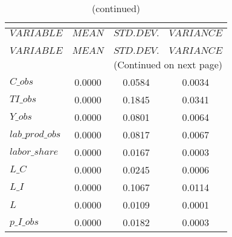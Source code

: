  
\begin{center}
\begin{longtable}{lccc} 
\caption{THEORETICAL MOMENTS}\\
 \label{Table:th_moments}\\
\toprule 
$VARIABLE        $	 & 	 $         MEAN$	 & 	 $    STD. DEV.$	 & 	 $     VARIANCE$\\
\midrule \endfirsthead 
\caption{(continued)}\\
 \toprule \\ 
$VARIABLE        $	 & 	 $         MEAN$	 & 	 $    STD. DEV.$	 & 	 $     VARIANCE$\\
\midrule \endhead 
\midrule \multicolumn{4}{r}{(Continued on next page)} \\ \bottomrule \endfoot 
\bottomrule \endlastfoot 
$C\_obs          $	 & 	       0.0000	 & 	       0.0584	 & 	       0.0034 \\ 
$TI\_obs         $	 & 	       0.0000	 & 	       0.1845	 & 	       0.0341 \\ 
$Y\_obs          $	 & 	       0.0000	 & 	       0.0801	 & 	       0.0064 \\ 
$lab\_prod\_obs  $	 & 	       0.0000	 & 	       0.0817	 & 	       0.0067 \\ 
$labor\_share    $	 & 	       0.0000	 & 	       0.0167	 & 	       0.0003 \\ 
$L\_C            $	 & 	       0.0000	 & 	       0.0245	 & 	       0.0006 \\ 
$L\_I            $	 & 	       0.0000	 & 	       0.1067	 & 	       0.0114 \\ 
$L               $	 & 	       0.0000	 & 	       0.0109	 & 	       0.0001 \\ 
$p\_I\_obs       $	 & 	       0.0000	 & 	       0.0182	 & 	       0.0003 \\ 
\end{longtable}
 \end{center}
